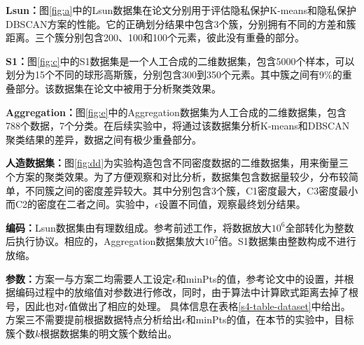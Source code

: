 \begin{compactitem}
	\item \textbf{Lsun：}图\ref{fig:a}中的Lsun数据集\cite{ultsch2005clustering}在论文\cite{wu2020secure,bozdemir2021privacy}分别用于评估隐私保护K-means和隐私保护DBSCAN方案的性能。它的正确划分结果中包含3个簇，分别拥有不同的方差和簇距离。三个簇分别包含200、100和100个元素，彼此没有重叠的部分。
	\item
	\textbf{S1：}图\ref{fig:c}中的S1\cite{franti2018k}数据集是一个人工合成的二维数据集，包含5000个样本，可以划分为15个不同的球形高斯簇，分别包含300到350个元素。其中簇之间有9\%的重叠部分。该数据集在论文\cite{bozdemir2021privacy,mohassel2019practical,su2007privacy}中被用于分析聚类效果。
	\item
	\textbf{Aggregation：}图\ref{fig:e}中的Aggregation数据集\cite{gionis2007clustering}为人工合成的二维数据集，包含788个数据，7个分类。在后续实验中，将通过该数据集分析K-means和DBSCAN聚类结果的差异，数据之间有极少重叠部分。
	\item
	\textbf{人造数据集：}图\ref{fig:dd}为实验构造包含不同密度数据的二维数据集，用来衡量三个方案的聚类效果。为了方便观察和对比分析，数据集包含数据量较少，分布较简单，不同簇之间的密度差异较大。其中分别包含3个簇，C1密度最大，C3密度最小而C2的密度在二者之间。实验中，$ \epsilon $设置不同值，观察最终划分结果。
\end{compactitem}

\textbf{编码：}Lsun数据集由有理数组成。参考前述工作\cite{jaschke2019unsupervised}，将数据放大$ 10^6 $全部转化为整数后执行协议。相应的，Aggregation数据集放大$ 10^2 $倍。S1数据集由整数构成不进行放缩。

\textbf{参数：}方案一与方案二均需要人工设定$\epsilon$和minPts的值，参考论文\cite{bozdemir2021privacy}中的设置，并根据编码过程中的放缩值对参数进行修改，同时，由于算法中计算欧式距离去掉了根号，因此也对$\epsilon$值做出了相应的处理。
具体信息在表格\ref{s4-table-dataset}中给出。
方案三不需要提前根据数据特点分析给出$\epsilon$和minPts的值，在本节的实验中，目标簇个数$ k $根据数据集的明文簇个数给出。

\begin{table}[htbp]
	\centering
	\renewcommand{\arraystretch}{1.3}
	\caption{数据集详细信息}
	\label{s4-table-dataset}
\end{table}

